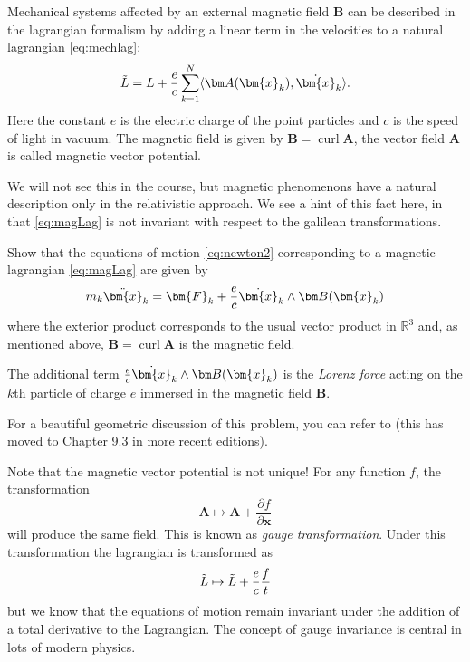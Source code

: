 \documentclass[english,fontsize=11pt,paper=a5,oneside]{scrbook}
\newcommand{\R}{\mathbb{R}}
\newcommand{\bx}{\bm{x}}
\newcommand{\lag}{\langle}
\newcommand{\rag}{\rangle}
\let\d\relax
\DeclareMathOperator{\d}{d}
\DeclareMathOperator{\curl}{curl}
\theoremstyle{definition}
\newenvironment{example}
  {\pushQED{\qed}\renewcommand{\qedsymbol}{$\lozenge$}\examplex}
  {\popQED\endexamplex}
\newenvironment{exercise}
  {\pushQED{\qed}\renewcommand{\qedsymbol}{$\maltese$}\exercisex}
  {\popQED\endexercisex}
\begin{document}
\begin{example}\label{exa:magnetic}
    Mechanical systems affected by an external magnetic field $\bm B$ can be described in the lagrangian formalism by adding a linear term in the velocities to a natural lagrangian \eqref{eq:mechlag}:
    \begin{equation}\label{eq:magLag}
        \tilde L = L + \frac ec \sum_{k=1}^N \lag\bm A(\bx_k), \dot \bx_k\rag.
    \end{equation}
    Here the constant $e$ is the electric charge of the point particles and $c$ is the speed of light in vacuum.
    The magnetic field is given by $\bm B = \curl \bm A$, the vector field $\bm A$ is called magnetic vector potential.
    
    We will not see this in the course, but magnetic phenomenons have a natural description only in the relativistic approach. We see a hint of this fact here, in that \eqref{eq:magLag} is not invariant with respect to the galilean transformations.
    
    \begin{exercise}\label{exe:magnetic}
        Show that the equations of motion \eqref{eq:newton2} corresponding to a magnetic lagrangian \eqref{eq:magLag} are given by
        \begin{equation}
            m_k \ddot\bx_k = \bm{F}_k + \frac ec \dot\bx_k \wedge \bm B(\bx_k)
        \end{equation}
        where the exterior product corresponds to the usual vector product in $\R^3$ and, as mentioned above, $\bm B = \curl \bm A$ is the magnetic field.

        The additional term $\frac ec \dot\bx_k\wedge \bm B(\bx_k)$ is the \emph{Lorenz force} acting on the $k$th particle of charge $e$ immersed in the magnetic field $\bm B$.

        For a beautiful geometric discussion of this problem, you can refer to \cite[Chapter 8.3]{book:amr} (this has moved to Chapter 9.3 in more recent editions).
    \end{exercise}
    
    Note that the magnetic vector potential is not unique!
    For any function $f$, the transformation
    \begin{equation}
        \bm A \mapsto \bm A + \frac{\partial f}{\partial \bx}
    \end{equation}
    will produce the same field.
    This is known as \emph{gauge transformation}.
    Under this transformation the lagrangian is transformed as
    \begin{equation}
        \tilde L \mapsto \tilde L + \frac{e}{c} \frac{\d f}{\d t}
    \end{equation}
    but we know that the equations of motion remain invariant under the addition of a total derivative to the Lagrangian.
    The concept of gauge invariance is central in lots of modern physics.
\end{example}
\end{document}
